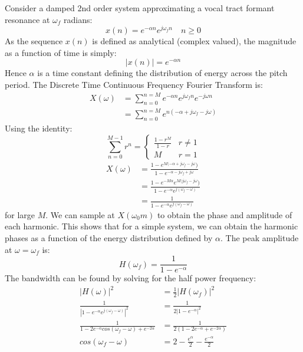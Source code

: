 \documentclass{article}
\begin{document}
Consider a damped 2nd order system approximating a vocal tract formant resonance at $\omega_f$ radians:
\begin{equation}
x(n) = e^{-\alpha n}e^{j \omega_f n} \quad n \ge 0
\end{equation}
As the sequence $x(n)$ is defined as analytical (complex valued), the magnitude as a function of time is simply:
\begin{equation}
|x(n)| = e^{-\alpha n}
\end{equation}
Hence $\alpha$ is a time constant defining the distribution of energy across the pitch period.  The Discrete Time Continuous Frequency Fourier Transform is:
\begin{equation}
\begin{split}
X(\omega) &= \sum_{n=0}^{n=M} e^{-\alpha n}e^{j \omega_f n}e^{-j \omega n} \\
           &= \sum_{n=0}^{n=M} e^{n(-\alpha + j \omega_f - j \omega)}
\end{split}
\end{equation}
Using the identity:
\begin{equation}
\label{eq:geo_sum}
\sum_{n=0}^{M-1} r^n = 
\begin{cases}
  \frac{1-r^M}{1-r} & r \ne 1 \\
   M                & r = 1 
\end{cases}   
\end{equation}
\begin{equation}
\label{eq:sec_order}
\begin{split}
X(\omega) &= \frac{1 - e^{M(-\alpha + j \omega_f - j \omega})}{1 - e^{-\alpha - j \omega_f + j \omega}} \\
          &= \frac{1 - e^{-M \alpha}e^{M( j \omega_f - j \omega})}{1 - e^{-\alpha}e^{ j( \omega_f - \omega)}} \\
           &= \frac{1}{1 - e^{-\alpha}e^{j (\omega_f - \omega)}}
\end{split}
\end{equation}
for large $M$.  We can sample at $X(\omega_0 m)$ to obtain the phase and amplitude of each harmonic. This shows that for a simple system, we can obtain the harmonic phases as a function of the energy distribution defined by $\alpha$.  The peak amplitude at $\omega=\omega_f$ is:
\begin{equation}
H(\omega_f) = \frac{1}{1-e^{-\alpha}}	
\end{equation}
The bandwidth can be found by solving for the half power frequency:
\begin{equation}
\begin{split}
|H(\omega)|^2 &= \frac{1}{2}|H(\omega_f)|^2 \\
\frac{1}{|1 - e^{-\alpha}e^{j (\omega_f - \omega)}|^2} &= \frac{1}{2|1-e^{-\alpha}|^2} \\
\frac{1}{1 - 2e^{-\alpha}cos(\omega_f - \omega) + e^{-2\alpha}} &= \frac{1}{2(1-2e^{-\alpha} + e^{-2 \alpha})} \\
cos(\omega_f - \omega) &= 2 - \frac{e^{\alpha}}{2} - \frac{e^{-\alpha}}{2}
\end{split}
\end{equation}
\end{document}
